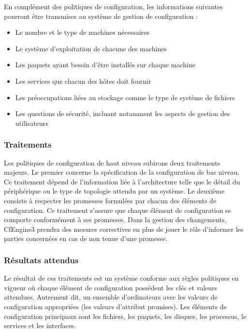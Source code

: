 En complément des politiques de configuration, les informations suivantes
pourront être transmises au système de gestion de configuration :

\begin{itemize}
    \item Le nombre et le type de machines nécessaires
    \item Le système d'exploitation de chacune des machines
    \item Les paquets ayant besoin d'être installés sur chaque machine
    \item Les services que chacun des hôtes doit fournir
    \item Les préoccupations liées au stockage comme le type de système de
        fichiers
    \item Les questions de sécurité, incluant notamment les aspects de gestion
        des utilisateurs
\end{itemize}

\subsubsection{Traitements}

Les politiques de configuration de haut niveau subirons deux traitements
majeurs. Le premier concerne la spécification de la configuration de bas
niveau. Ce traitement dépend de l'information liée à l'architecture telle que le
détail du périphérique ou le type de topologie attendu par un système.
Le deuxième consiste à respecter les promesses formulées par chacun des éléments
de configuration. Ce traitement s'assure que chaque élément de configuration se
comporte conformément à ses promesses. Dans la gestion des changements,
CfEngine3 prendra des mesures correctives en plus de jouer le rôle d'informer
les parties concernées en cas de non tenue d'une promesse.

\subsubsection{Résultats attendus}

Le résultat de ces traitements est un système conforme aux règles politiques en
vigueur où chaque élément de configuration possèdent les clés et valeurs
attendues.  Autrement dit, un ensemble d'ordinateurs avec les valeurs de
configuration appropriées (les valeurs d'attribut promises).  Les éléments de
configuration principaux sont les fichiers, les paquets, les disques, les
processus, le services et les interfaces. 

